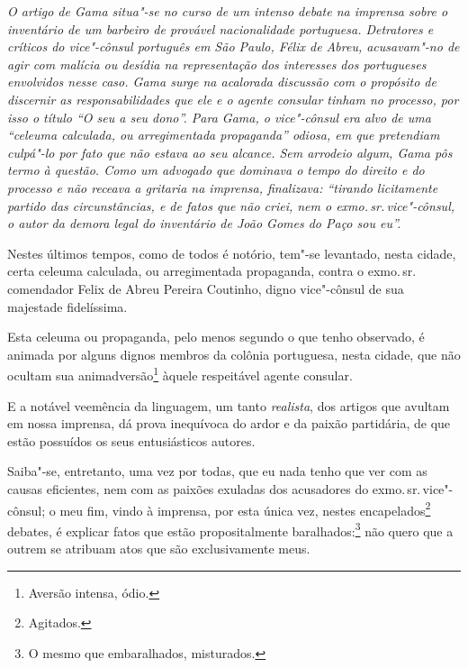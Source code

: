 
\begin{flushleft}
{\footnotesize\itshape
O artigo de Gama situa"-se no
curso de um intenso debate na imprensa sobre o inventário de um barbeiro
de provável nacionalidade portuguesa. Detratores e críticos do
vice"-cônsul português em São Paulo, Félix de Abreu, acusavam"-no de agir
com malícia ou desídia na representação dos interesses dos portugueses
envolvidos nesse caso. Gama surge na acalorada discussão com o propósito
de discernir as responsabilidades que ele e o agente consular tinham no
processo, por isso o título ``O seu a seu dono''. Para Gama, o vice"-cônsul
era alvo de uma ``celeuma calculada, ou arregimentada propaganda'' odiosa,
em que pretendiam culpá"-lo por fato que não estava ao seu alcance. Sem
arrodeio algum, Gama pôs termo à questão. Como um advogado que dominava
o tempo do direito e do processo e não receava a gritaria na imprensa,
finalizava: ``tirando licitamente partido das circunstâncias, e de
fatos que não criei, nem o exmo.\,sr.\,vice"-cônsul, o autor da demora
legal do inventário de João Gomes do Paço sou eu''. }
\end{flushleft}

Nestes últimos tempos, como de todos é notório, tem"-se levantado, nesta
cidade, certa celeuma calculada, ou arregimentada propaganda, contra o
exmo.\,sr.\,comendador Felix de Abreu Pereira Coutinho, digno vice"-cônsul
de sua majestade fidelíssima.

Esta celeuma ou propaganda, pelo menos segundo o que tenho observado, é
animada por alguns dignos membros da colônia portuguesa, nesta cidade,
que não ocultam sua animadversão\footnote{Aversão intensa, ódio.}
àquele respeitável agente consular.

E a notável veemência da linguagem, um tanto \emph{realista}, dos
artigos que avultam em nossa imprensa, dá prova inequívoca do ardor e da
paixão partidária, de que estão possuídos os seus entusiásticos autores.

Saiba"-se, entretanto, uma vez por todas, que eu nada tenho que ver com
as causas eficientes, nem com as paixões exuladas dos acusadores do
exmo.\,sr.\,vice"-cônsul; o meu fim, vindo à imprensa, por esta única vez,
nestes encapelados\footnote{Agitados.} debates, é explicar fatos que
estão propositalmente baralhados:\footnote{O mesmo que embaralhados,
  misturados.} não quero que a outrem se atribuam atos que são
exclusivamente meus.

